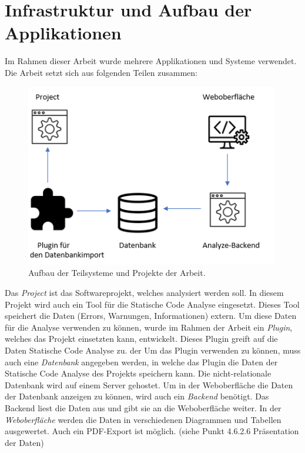 \section{Infrastruktur und Aufbau der Applikationen} 
Im Rahmen dieser Arbeit wurde mehrere Applikationen und Systeme verwendet. Die Arbeit setzt sich aus folgenden Teilen zusammen:

\begin{figure}[tp]
  \centering
  \includegraphics[height=8cm]{images/infrastruktur.PNG}
 \caption[Aufbau der Teilsysteme und Projekte der Arbeit]{Aufbau der Teilsysteme und Projekte der Arbeit.}
  \label{fig:engine}
\end{figure}

Das \textit{Project} ist das Softwareprojekt, welches analysiert werden soll. In diesem Projekt wird auch ein Tool für die Statische Code Analyse eingesetzt. Dieses Tool speichert die Daten (Errors, Warnungen, Informationen) extern. Um diese Daten für die Analyse verwenden zu können, wurde im Rahmen der Arbeit ein \textit{Plugin}, welches das Projekt einsetzten kann, entwickelt. Dieses Plugin greift auf die Daten Statische Code Analyse zu. der Um das Plugin verwenden zu können, muss auch eine \textit{Datenbank} angegeben werden, in welche das Plugin die Daten der Statische Code Analyse des Projekts speichern kann. Die nicht-relationale Datenbank wird auf einem Server gehostet. Um in der Weboberfläche die Daten der Datenbank anzeigen zu können, wird auch ein \textit{Backend} benötigt. Das Backend liest die Daten aus und gibt sie an die Weboberfläche weiter. In der \textit{Weboberfläche} werden die Daten in verschiedenen Diagrammen und Tabellen ausgewertet. Auch ein PDF-Export ist möglich. (siehe Punkt 4.6.2.6 Präsentation der Daten)


